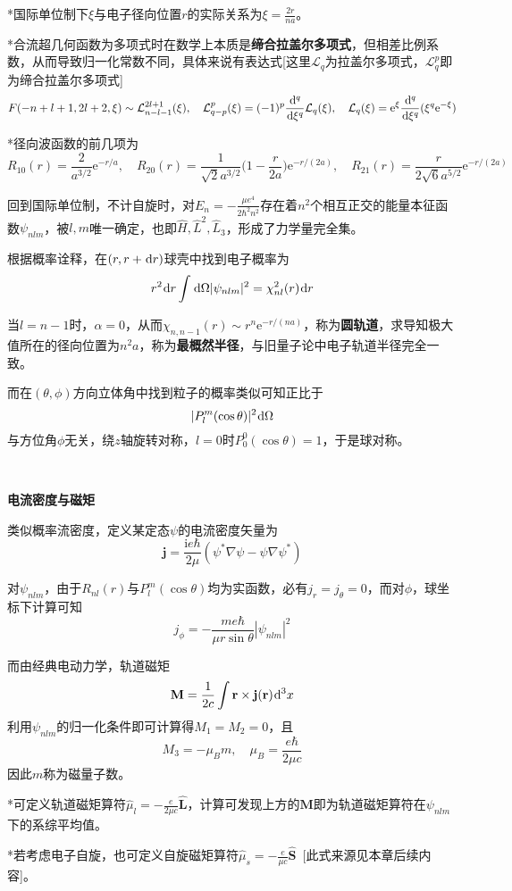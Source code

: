 \documentclass[a4paper,UTF8,fontset=windows]{ctexart}
\newcommand*{\dr}{\hspace{0.07em}\mathrm{d}}
\newcommand*{\ir}{\mathrm{i}}
\newcommand*{\er}{\mathrm{e}}
\newcommand*{\br}{\mathbf{r}}
\begin{document}
*国际单位制下$\xi$与电子径向位置$r$的实际关系为$\xi=\frac{2r}{na}$。

*合流超几何函数为多项式时在数学上本质是\textbf{缔合拉盖尔多项式}，但相差比例系数，从而导致归一化常数不同，具体来说有表达式[这里$\mathcal{L}_q$为拉盖尔多项式，$\mathcal{L}^p_q$即为缔合拉盖尔多项式]
$$F(-n+l+1,2l+2,\xi)\sim\mathcal{L}_{n-l-1}^{2l+1}(\xi),\quad\mathcal{L}_{q-p}^p(\xi)=(-1)^p\frac{\dr^q}{\dr\xi^q}\mathcal{L}_q(\xi),\quad\mathcal{L}_q(\xi)=\er^\xi\frac{\dr^q}{\dr\xi^q}(\xi^q\er^{-\xi})$$

*径向波函数的前几项为
$$R_{10}(r)=\frac{2}{a^{3/2}}\er^{-r/a},\quad R_{20}(r)=\frac{1}{\sqrt{2}a^{3/2}}\bigg(1-\frac{r}{2a}\bigg)\er^{-r/(2a)},\quad R_{21}(r)=\frac{r}{2\sqrt{6}a^{5/2}}\er^{-r/(2a)}$$

回到国际单位制，不计自旋时，对$E_n=-\frac{\mu e^4}{2\hbar^2n^2}$存在着$n^2$个相互正交的能量本征函数$\psi_{nlm}$，被$l,m$唯一确定，也即$\hat{H},\hat{L}^2,\hat{L}_3$，形成了力学量完全集。

根据概率诠释，在$(r,r+\dr r)$球壳中找到电子概率为
$$r^2\dr r\int\dr\Omega|\psi_{nlm}|^2=\chi_{nl}^2(r)\dr r$$

当$l=n-1$时，$\alpha=0$，从而$\chi_{n,n-1}(r)\sim r^n\er^{-r/(na)}$，称为\textbf{圆轨道}，求导知极大值所在的径向位置为$n^2a$，称为\textbf{最概然半径}，与旧量子论中电子轨道半径完全一致。

而在$(\theta,\phi)$方向立体角中找到粒子的概率类似可知正比于
$$|P_l^m(\cos\theta)|^2\dr\Omega$$
与方位角$\phi$无关，绕$z$轴旋转对称，$l=0$时$P_0^0(\cos\theta)=1$，于是球对称。

\

\textbf{电流密度与磁矩}

类似概率流密度，定义某定态$\psi$的电流密度矢量为
$$\mathbf{j}=\frac{\ir e\hbar}{2\mu}(\psi^*\nabla\psi-\psi\nabla\psi^*)$$

对$\psi_{nlm}$，由于$R_{nl}(r)$与$P_l^m(\cos\theta)$均为实函数，必有$j_r=j_\theta=0$，而对$\phi$，球坐标下计算可知
$$j_\phi=-\frac{me\hbar}{\mu r\sin\theta}|\psi_{nlm}|^2$$

而由经典电动力学，轨道磁矩
$$\mathbf{M}=\frac{1}{2c}\int\br\times\mathbf{j}(\br)\dr^3x$$
利用$\psi_{nlm}$的归一化条件即可计算得$M_1=M_2=0$，且$$M_3=-\mu_Bm,\quad\mu_B=\frac{e\hbar}{2\mu c}$$
因此$m$称为磁量子数。

*可定义轨道磁矩算符$\hat{\mu}_l=-\frac{e}{2\mu c}\hat{\mathbf{L}}$，计算可发现上方的$\mathbf{M}$即为轨道磁矩算符在$\psi_{nlm}$下的系综平均值。

*若考虑电子自旋，也可定义自旋磁矩算符$\hat{\mu}_s=-\frac{e}{\mu c}\hat{\mathbf{S}}$\ [此式来源见本章后续内容]。
\end{document}
